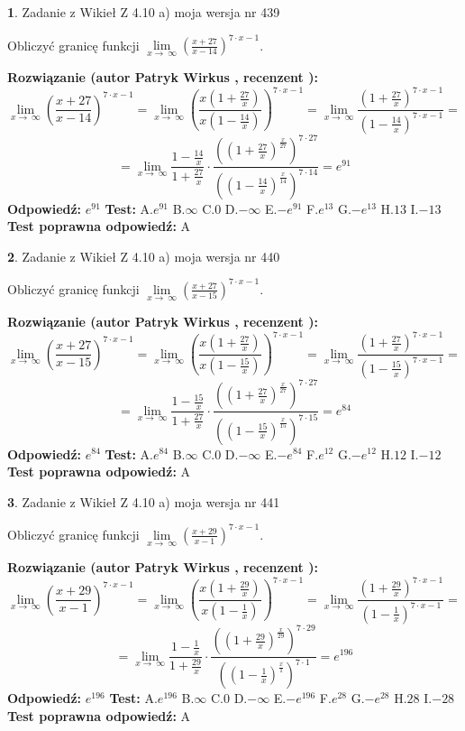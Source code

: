 \documentclass[12pt, a4paper]{article}
\theoremstyle{definition} %
\newtheorem{zad}{}
\newcommand{\zadStart}[1]{\begin{zad}#1\newline}
\newcommand{\zadStop}{\end{zad}}
\newcommand{\rozwStart}[2]{\noindent \textbf{Rozwiązanie (autor #1 , recenzent #2): }\newline}
\newcommand{\rozwStop}{\newline}
\newcommand{\odpStart}{\noindent \textbf{Odpowiedź:}\newline}
\newcommand{\odpStop}{\newline}
\newcommand{\testStart}{\noindent \textbf{Test:}\newline}
\newcommand{\testStop}{\newline}
\newcommand{\kluczStart}{\noindent \textbf{Test poprawna odpowiedź:}\newline}
\newcommand{\kluczStop}{\newline}
\begin{document}
\zadStart{Zadanie z Wikieł Z 4.10 a) moja wersja nr 439}

Obliczyć granicę funkcji  $\lim\limits_{x\to\ \infty}(\frac{x+27}{x-14})^{7\cdot x-1}$.
\zadStop
\rozwStart{Patryk Wirkus}{}
$$\lim\limits_{x\to\ \infty}(\frac{x+27}{x-14})^{7\cdot x-1} = \lim\limits_{x\to\ \infty}(\frac{x(1+\frac{27}{x})}{x(1-\frac{14}{x})})^{7\cdot x-1}=\lim\limits_{x\to\ \infty}\frac{(1+\frac{27}{x})^{7\cdot x-1}}{(1-\frac{14}{x})^{7\cdot x-1}}=$$
$$=\lim\limits_{x\to\ \infty}\frac{1-\frac{14}{x}}{1+\frac{27}{x}}\cdot\frac{((1+\frac{27}{x})^{\frac{x}{27}})^{7\cdot27}}{((1-\frac{14}{x})^{\frac{x}{14}})^{7\cdot14}}=e^{91}$$
\rozwStop
\odpStart
$e^{91}$
\odpStop
\testStart
A.$e^{91}$ B.$\infty$ C.$0$ D.$-\infty$ E.$-e^{91}$
F.$e^{13}$ G.$-e^{13}$
H.$13$
I.$-13$
\testStop
\kluczStart
A
\kluczStop



\zadStart{Zadanie z Wikieł Z 4.10 a) moja wersja nr 440}

Obliczyć granicę funkcji  $\lim\limits_{x\to\ \infty}(\frac{x+27}{x-15})^{7\cdot x-1}$.
\zadStop
\rozwStart{Patryk Wirkus}{}
$$\lim\limits_{x\to\ \infty}(\frac{x+27}{x-15})^{7\cdot x-1} = \lim\limits_{x\to\ \infty}(\frac{x(1+\frac{27}{x})}{x(1-\frac{15}{x})})^{7\cdot x-1}=\lim\limits_{x\to\ \infty}\frac{(1+\frac{27}{x})^{7\cdot x-1}}{(1-\frac{15}{x})^{7\cdot x-1}}=$$
$$=\lim\limits_{x\to\ \infty}\frac{1-\frac{15}{x}}{1+\frac{27}{x}}\cdot\frac{((1+\frac{27}{x})^{\frac{x}{27}})^{7\cdot27}}{((1-\frac{15}{x})^{\frac{x}{15}})^{7\cdot15}}=e^{84}$$
\rozwStop
\odpStart
$e^{84}$
\odpStop
\testStart
A.$e^{84}$ B.$\infty$ C.$0$ D.$-\infty$ E.$-e^{84}$
F.$e^{12}$ G.$-e^{12}$
H.$12$
I.$-12$
\testStop
\kluczStart
A
\kluczStop



\zadStart{Zadanie z Wikieł Z 4.10 a) moja wersja nr 441}

Obliczyć granicę funkcji  $\lim\limits_{x\to\ \infty}(\frac{x+29}{x-1})^{7\cdot x-1}$.
\zadStop
\rozwStart{Patryk Wirkus}{}
$$\lim\limits_{x\to\ \infty}(\frac{x+29}{x-1})^{7\cdot x-1} = \lim\limits_{x\to\ \infty}(\frac{x(1+\frac{29}{x})}{x(1-\frac{1}{x})})^{7\cdot x-1}=\lim\limits_{x\to\ \infty}\frac{(1+\frac{29}{x})^{7\cdot x-1}}{(1-\frac{1}{x})^{7\cdot x-1}}=$$
$$=\lim\limits_{x\to\ \infty}\frac{1-\frac{1}{x}}{1+\frac{29}{x}}\cdot\frac{((1+\frac{29}{x})^{\frac{x}{29}})^{7\cdot29}}{((1-\frac{1}{x})^{\frac{x}{1}})^{7\cdot1}}=e^{196}$$
\rozwStop
\odpStart
$e^{196}$
\odpStop
\testStart
A.$e^{196}$ B.$\infty$ C.$0$ D.$-\infty$ E.$-e^{196}$
F.$e^{28}$ G.$-e^{28}$
H.$28$
I.$-28$
\testStop
\kluczStart
A
\kluczStop
\end{document}
